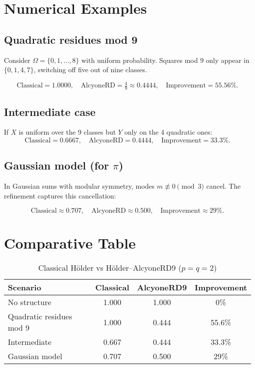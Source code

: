 \documentclass[12pt,a4paper]{article}
\theoremstyle{plain}
\begin{document}
\section{Numerical Examples}
\subsection{Quadratic residues mod 9}
Consider $\Omega = \{0,1,\dots,8\}$ with uniform probability. 
Squares mod 9 only appear in $\{0,1,4,7\}$, switching off five out of nine classes.

\[
\text{Classical} = 1.0000, \quad
\text{AlcyoneRD} = \tfrac{4}{9} \approx 0.4444, \quad
\text{Improvement} = 55.56\%.
\]

\subsection{Intermediate case}
If $X$ is uniform over the 9 classes but $Y$ only on the 4 quadratic ones:
\[
\text{Classical} = 0.6667, \quad
\text{AlcyoneRD} = 0.4444, \quad
\text{Improvement} = 33.3\%.
\]

\subsection{Gaussian model (for $\pi$)}
In Gaussian sums with modular symmetry, modes $m\not\equiv 0\pmod{3}$ cancel. 
The refinement captures this cancellation:

\[
\text{Classical} \approx 0.707, \quad
\text{AlcyoneRD} \approx 0.500, \quad
\text{Improvement} \approx 29\%.
\]

\section{Comparative Table}
\begin{table}[h]
\centering
\caption{Classical Hölder vs Hölder–AlcyoneRD9 ($p=q=2$)}
\begin{tabular}{lccc}
\toprule
Scenario & Classical & AlcyoneRD9 & Improvement \\
\midrule
No structure & 1.000 & 1.000 & 0\% \\
Quadratic residues mod 9 & 1.000 & 0.444 & 55.6\% \\
Intermediate & 0.667 & 0.444 & 33.3\% \\
Gaussian model & 0.707 & 0.500 & 29\% \\
\bottomrule
\end{tabular}
\end{table}
\end{document}
